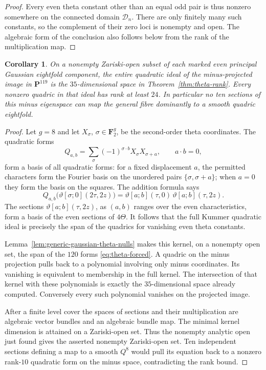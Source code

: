 \documentclass[11pt]{article}
\newtheorem{corollary}[theorem]{Corollary}
\theoremstyle{definition}
\theoremstyle{remark}
\begin{document}
\begin{proof}
Every even theta constant other than an equal odd pair is thus
nonzero somewhere on the connected domain $\mathcal D_n$.
There are only finitely many such constants, so the complement
of their zero loci is nonempty and open. The algebraic form of
the conclusion also follows below from the rank of the
multiplication map.
\end{proof}

\begin{corollary}\label{cor:all-eightfold-quadrics}
On a nonempty Zariski-open subset of each marked even principal
Gaussian eightfold component, the entire quadratic ideal of the
minus-projected image in $\mathbf P^{119}$ is the
$35$-dimensional space in Theorem~\ref{thm:theta-rank}.
Every nonzero quadric in that ideal has rank at least $24$.
In particular no ten sections of this minus eigenspace can map
the general fibre dominantly to a smooth quadric eightfold.
\end{corollary}

\begin{proof}
Let $g=8$ and let $X_\sigma$, $\sigma\in\mathbf F_2^g$, be the
second-order theta coordinates. The quadratic forms
\[
 Q_{a,b}=\sum_\sigma(-1)^{\sigma\cdot b}
                 X_\sigma X_{\sigma+a},
 \qquad a\cdot b=0,
\]
form a basis of all quadratic forms: for a fixed displacement $a$,
the permitted characters form the Fourier basis on the unordered
pairs $\{\sigma,\sigma+a\}$; when $a=0$ they form the basis on
the squares. The addition formula
\cite[\S3.5, pp.~622--623]{vG96} says
\[
 Q_{a,b}\bigl(\vartheta[\sigma;0](2\tau,2z)\bigr)
 =\vartheta[a;b](\tau,0)\,\vartheta[a;b](\tau,2z).
\]
The sections $\vartheta[a;b](\tau,2z)$, as $(a,b)$ ranges over the
even characteristics, form a basis of the even sections of $4\Theta$.
It follows that the full Kummer quadratic ideal is precisely the
span of the quadrics for vanishing even theta constants.

Lemma~\ref{lem:generic-gaussian-theta-nulls} makes this kernel,
on a nonempty open set, the span of the $120$ forms
\eqref{eq:theta-forced}. A quadric on the minus projection
pulls back to a polynomial involving only minus coordinates.
Its vanishing is equivalent to membership in the full kernel.
The intersection of that kernel with these polynomials is
exactly the $35$-dimensional space already computed.
Conversely every such polynomial vanishes on the projected image.

After a finite level cover the spaces of sections and their
multiplication are algebraic vector bundles and an algebraic
bundle map. The minimal kernel dimension is attained on a
Zariski-open set. Thus the nonempty analytic open just found
gives the asserted nonempty Zariski-open set.
Ten independent sections defining a map to a smooth $Q^8$
would pull its equation back to a nonzero rank-$10$ quadratic
form on the minus space, contradicting the rank bound.
\end{proof}
\end{document}
